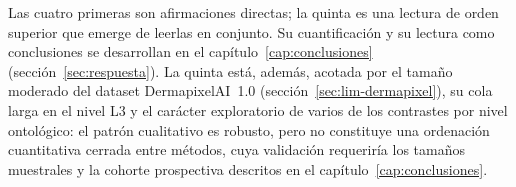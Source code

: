 Las cuatro primeras son afirmaciones directas; la quinta es una lectura
de orden superior que emerge de leerlas en conjunto. Su cuantificación y
su lectura como conclusiones se desarrollan en el
capítulo~\ref{cap:conclusiones} (sección~\ref{sec:respuesta}). La quinta
está, además, acotada por el tamaño moderado del dataset
DermapixelAI~1.0 (sección~\ref{sec:lim-dermapixel}), su cola larga en el
nivel L3 y el carácter exploratorio de varios de los contrastes por
nivel ontológico: el patrón cualitativo es robusto, pero no constituye
una ordenación cuantitativa cerrada entre métodos, cuya validación
requeriría los tamaños muestrales y la cohorte prospectiva descritos en
el capítulo~\ref{cap:conclusiones}.
